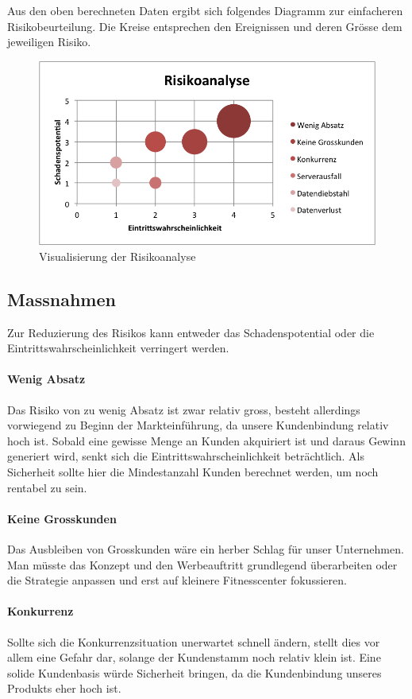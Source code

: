 Aus den oben berechneten Daten ergibt sich folgendes Diagramm zur einfacheren Risikobeurteilung. Die Kreise entsprechen den Ereignissen und deren Grösse dem jeweiligen Risiko.
\begin{figure}[H]
	\centering
	\includegraphics[width=0.8\linewidth]{images/risikoanalyse}
	\caption{Visualisierung der Risikoanalyse}
	\label{fig:visualisierung-risikoanalyse}
\end{figure}

\subsection{Massnahmen}
Zur Reduzierung des Risikos kann entweder das Schadenspotential oder die Eintrittswahrscheinlichkeit verringert werden.
\paragraph{Wenig Absatz}
Das Risiko von zu wenig Absatz ist zwar relativ gross, besteht allerdings vorwiegend zu Beginn der Markteinführung, da unsere Kundenbindung relativ hoch ist. Sobald eine gewisse Menge an Kunden akquiriert ist und daraus Gewinn generiert wird, senkt sich die Eintrittswahrscheinlichkeit beträchtlich. Als Sicherheit sollte hier die Mindestanzahl Kunden berechnet werden, um noch rentabel zu sein. 
\paragraph{Keine Grosskunden}
Das Ausbleiben von Grosskunden wäre ein herber Schlag für unser Unternehmen. Man müsste das Konzept und den Werbeauftritt grundlegend überarbeiten oder die Strategie anpassen und erst auf kleinere Fitnesscenter fokussieren.
\paragraph{Konkurrenz}
Sollte sich die Konkurrenzsituation unerwartet schnell ändern, stellt dies vor allem eine Gefahr dar, solange der Kundenstamm noch relativ klein ist. Eine solide Kundenbasis würde Sicherheit bringen, da die Kundenbindung unseres Produkts eher hoch ist.
